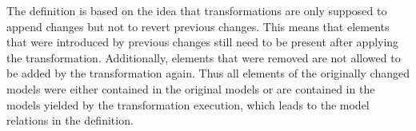 The definition is based on the idea that transformations are only supposed to append changes but not to revert previous changes.
This means that elements that were introduced by previous changes still need to be present after applying the transformation.
Additionally, elements that were removed are not allowed to be added by the transformation again.
Thus all elements of the originally changed models were either contained in the original models or are contained in the models yielded by the transformation execution, which leads to the model relations in the definition.


